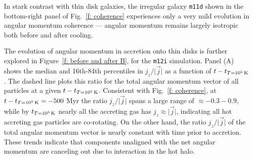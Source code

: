 \documentclass[fleqn,usenatbib]{mnras}
\newcommand{\tcon}{t_{T=10^5\,{\rm K}}}
\begin{document}
In stark contrast with thin disk galaxies, the irregular galaxy \texttt{m11d} shown in the bottom-right panel of Fig.~\ref{f: coherence} experiences only a very mild evolution in angular momentum coherence --- angular momentum remains largely isotropic both before and after cooling.




The evolution of angular momentum in accretion onto thin disks is further explored in Figure~\ref{f: before and after B}, for the \texttt{m12i} simulation.
Panel (A) shows the median and 16th-84th percentiles in $j_z/\vert\vec j\vert$ as a function of $t-\tcon$.
The dashed line plots this ratio for the total angular momentum vector of all particles at a given $t-\tcon$. 
Consistent with Fig.~\ref{f: coherence}, at $t-\tcon=-500$ Myr the ratio $j_z/\vert\vec j\vert$ spans a large range of $\approx -0.3 - 0.9$, while by $\tcon$ nearly all the accreting gas has $j_z\approx\vert\vec j\vert$, indicating all hot accreting gas particles are co-rotating.
On the other hand, the ratio $j_z/\vert\vec j\vert$ of the total angular momentum vector is nearly constant with time prior to accretion. 
These trends indicate that components unaligned with the net angular momentum are canceling out due to interaction in the hot halo.
\end{document}
